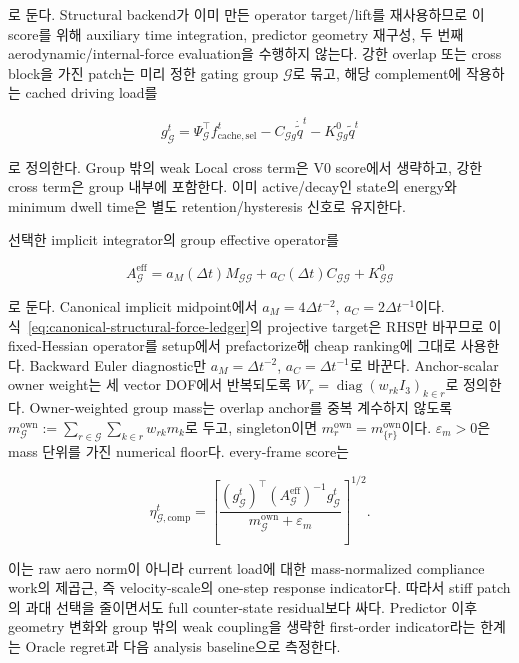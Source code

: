 \documentclass[11pt,a4paper]{article}
\newcommand{\eps}{\varepsilon}
\begin{document}
로 둔다. Structural backend가 이미 만든 operator target/lift를 재사용하므로
이 score를 위해 auxiliary time integration, predictor geometry 재구성,
두 번째 aerodynamic/internal-force evaluation을 수행하지 않는다.
강한 overlap 또는 cross block을 가진 patch는 미리 정한 gating group \(\mathcal G\)로 묶고,
해당 complement에 작용하는 cached driving load를

\begin{equation}
  g_{\mathcal G}^t
  =
  \Psi_{\mathcal G}^{\top}f_{\mathrm{cache,sel}}^t
  -C_{\mathcal Gg}\dot{\widetilde q}^{t}
  -K_{\mathcal Gg}^{0}\widetilde q^{t}
  \label{eq:cached-local-drive}
\end{equation}

로 정의한다. Group 밖의 weak Local cross term은 V0 score에서 생략하고,
강한 cross term은 group 내부에 포함한다. 이미 active/decay인 state의 energy와
minimum dwell time은 별도 retention/hysteresis 신호로 유지한다.

선택한 implicit integrator의 group effective operator를

\begin{equation}
  A_{\mathcal G}^{\mathrm{eff}}
  =a_M(\Delta t)M_{\mathcal G\mathcal G}
  +a_C(\Delta t)C_{\mathcal G\mathcal G}
  +K_{\mathcal G\mathcal G}^{0}
\end{equation}

로 둔다. Canonical implicit midpoint에서
\(a_M=4\Delta t^{-2}\), \(a_C=2\Delta t^{-1}\)이다.
식~\eqref{eq:canonical-structural-force-ledger}의 projective target은 RHS만 바꾸므로
이 fixed-Hessian operator를 setup에서 prefactorize해 cheap ranking에 그대로 사용한다.
Backward Euler diagnostic만 \(a_M=\Delta t^{-2}\), \(a_C=\Delta t^{-1}\)로 바꾼다.
Anchor-scalar owner weight는 세 vector DOF에서 반복되도록
\(W_r=\operatorname{diag}(w_{rk}I_3)_{k\in r}\)로 정의한다.
Owner-weighted group mass는 overlap anchor를 중복 계수하지 않도록
\(m_{\mathcal G}^{\mathrm{own}}:=\sum_{r\in\mathcal G}\sum_{k\in r}w_{rk}m_k\)로 두고,
singleton이면 \(m_r^{\mathrm{own}}=m_{\{r\}}^{\mathrm{own}}\)이다.
\(\eps_m>0\)은 mass 단위를 가진 numerical floor다.
every-frame score는

\begin{equation}
  \eta_{\mathcal G,\mathrm{comp}}^t
  =
  \left[
  \frac{
    (g_{\mathcal G}^t)^\top
    (A_{\mathcal G}^{\mathrm{eff}})^{-1}g_{\mathcal G}^t
  }{
    m_{\mathcal G}^{\mathrm{own}}+\eps_m
  }
  \right]^{1/2}.
  \label{eq:cheap-dynamic-compliance}
\end{equation}

이는 raw aero norm이 아니라 current load에 대한 mass-normalized compliance work의 제곱근,
즉 velocity-scale의 one-step response indicator다.
따라서 stiff patch의 과대 선택을 줄이면서도 full counter-state residual보다 싸다.
Predictor 이후 geometry 변화와 group 밖의 weak coupling을 생략한 first-order indicator라는 한계는
Oracle regret과 다음 analysis baseline으로 측정한다.
\end{document}
